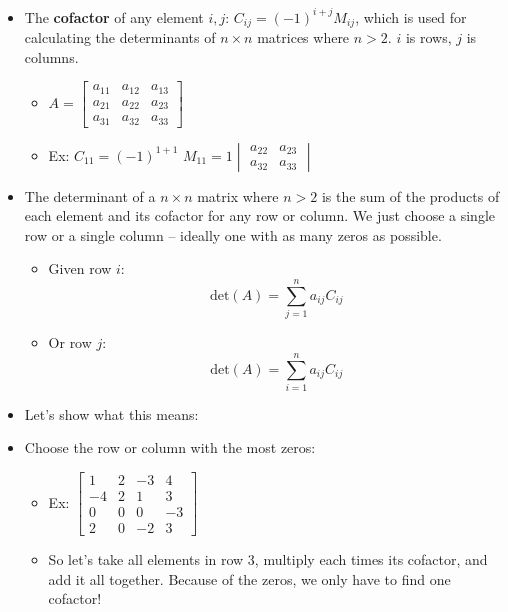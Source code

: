 \begin{itemize}
    \item The \textbf{cofactor} of any element $i,j$: $C_{ij} = (-1)^{i + j}M_{ij}$, which is used for calculating the determinants of $n \times n$ matrices where $n > 2$.  $i$ is rows, $j$ is columns.
    \begin{itemize}
        \item $
        A = \begin{bmatrix}
            a_{11} & a_{12} & a_{13} \\
            a_{21} & a_{22} & a_{23} \\
            a_{31} & a_{32} & a_{33}
        \end{bmatrix} 
        $
        \item Ex: $C_{11} = (-1)^{1 + 1} \, \, M_{11} = 1\begin{vmatrix}
            a_{22} & a_{23} \\
            a_{32} & a_{33}
        \end{vmatrix}$
    \end{itemize} 
    \item The determinant of a $n \times n$ matrix where $n >2$ is the sum of the products of each element and its cofactor for any row or column. We just choose a single row or a single column -- ideally one with as many zeros as possible.
    \begin{itemize}
        \item Given row $i$:
        \begin{equation*}
            \text{det}(A) = \sum_{j = 1}^n a_{ij}C_{ij}
        \end{equation*}
        \item Or row $j$:
        \begin{equation*}
            \text{det}(A) = \sum_{i = 1}^n a_{ij}C_{ij}
        \end{equation*}
    \end{itemize}
    \item Let's show what this means:
    \item Choose the row or column with the most zeros:
    \begin{itemize}
        \item Ex: $\begin{bmatrix}
            1 & 2 & -3 & 4 \\
            -4 & 2 & 1 & 3 \\
            0 & 0 & 0 & -3 \\
            2 & 0 & -2 & 3
        \end{bmatrix}$
        \item So let's take all elements in row 3, multiply each times its cofactor, and add it all together. Because of the zeros, we only have to find one cofactor! 
        

\end{itemize}
\end{itemize}
